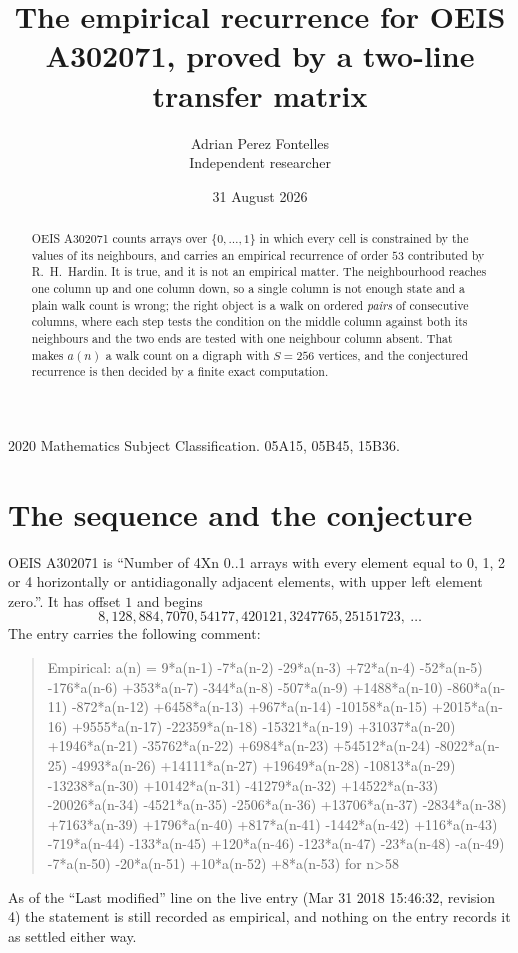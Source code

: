 \documentclass[11pt,a4paper]{article}
\title{The empirical recurrence for OEIS A302071, proved by a two-line transfer matrix}
\author{Adrian Perez Fontelles\\ \small Independent researcher}
\date{31 August 2026}
\theoremstyle{plain}
\theoremstyle{definition}
\begin{document}
\maketitle

\begin{abstract}
OEIS A302071 counts arrays over $\{0,\dots,1\}$ in which every cell is constrained by the
values of its neighbours, and carries an empirical recurrence of order $53$ contributed
by R.~H.~Hardin. It is true, and it is not an empirical matter. The neighbourhood reaches one
column up and one column down, so a single column is not enough state and a plain walk count
is wrong; the right object is a walk on ordered \emph{pairs} of consecutive columns, where
each step tests the condition on the middle column against both its neighbours and the two
ends are tested with one neighbour column absent. That makes $a(n)$ a walk count on a digraph
with $S=256$ vertices, and the conjectured recurrence is then decided by a finite exact
computation.
\end{abstract}

\noindent\small 2020 Mathematics Subject Classification. 05A15, 05B45, 15B36.\normalsize

\section{The sequence and the conjecture}

OEIS A302071 is ``Number of 4Xn 0..1 arrays with every element equal to 0, 1, 2 or 4 horizontally or antidiagonally adjacent elements, with upper left element zero.''. It has offset $1$ and begins
\[
8, 128, 884, 7070, 54177, 420121, 3247765, 25151723,\ \dots
\]
The entry carries the following comment:
\begin{quote}\small
Empirical: a(n) = 9*a(n-1) -7*a(n-2) -29*a(n-3) +72*a(n-4) -52*a(n-5) -176*a(n-6) +353*a(n-7) -344*a(n-8) -507*a(n-9) +1488*a(n-10) -860*a(n-11) -872*a(n-12) +6458*a(n-13) +967*a(n-14) -10158*a(n-15) +2015*a(n-16) +9555*a(n-17) -22359*a(n-18) -15321*a(n-19) +31037*a(n-20) +1946*a(n-21) -35762*a(n-22) +6984*a(n-23) +54512*a(n-24) -8022*a(n-25) -4993*a(n-26) +14111*a(n-27) +19649*a(n-28) -10813*a(n-29) -13238*a(n-30) +10142*a(n-31) -41279*a(n-32) +14522*a(n-33) -20026*a(n-34) -4521*a(n-35) -2506*a(n-36) +13706*a(n-37) -2834*a(n-38) +7163*a(n-39) +1796*a(n-40) +817*a(n-41) -1442*a(n-42) +116*a(n-43) -719*a(n-44) -133*a(n-45) +120*a(n-46) -123*a(n-47) -23*a(n-48) -a(n-49) -7*a(n-50) -20*a(n-51) +10*a(n-52) +8*a(n-53) for n>58
\end{quote}
As of the ``Last modified'' line on the live entry (Mar 31 2018 15:46:32, revision 4) the statement is
still recorded as empirical, and nothing on the entry records it as settled either way.
\end{document}
